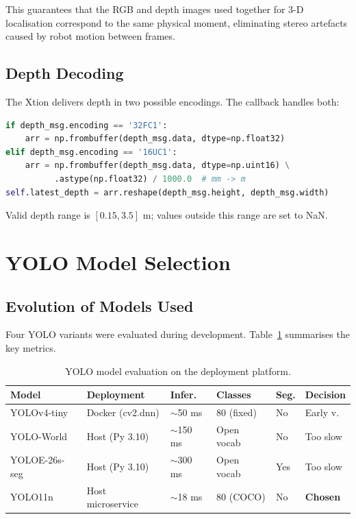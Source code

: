 This guarantees that the RGB and depth images used together for 3-D localisation
correspond to the same physical moment, eliminating stereo artefacts caused by
robot motion between frames.

\subsection{Depth Decoding}

The Xtion delivers depth in two possible encodings.
The callback handles both:

\begin{lstlisting}[language=Python, caption={Depth image decoding.}]
if depth_msg.encoding == '32FC1':
    arr = np.frombuffer(depth_msg.data, dtype=np.float32)
elif depth_msg.encoding == '16UC1':
    arr = np.frombuffer(depth_msg.data, dtype=np.uint16) \
          .astype(np.float32) / 1000.0  # mm -> m
self.latest_depth = arr.reshape(depth_msg.height, depth_msg.width)
\end{lstlisting}

Valid depth range is $[0.15, 3.5]$ m; values outside this range are set to NaN.

\section{YOLO Model Selection}

\subsection{Evolution of Models Used}

Four YOLO variants were evaluated during development.
Table~\ref{tab:yolo_eval} summarises the key metrics.

\begin{table}[H]
\centering
\caption{YOLO model evaluation on the deployment platform.}
\label{tab:yolo_eval}
\small
\begin{tabular}{llllll}
\toprule
\textbf{Model} & \textbf{Deployment} & \textbf{Infer.} & \textbf{Classes} & \textbf{Seg.} & \textbf{Decision} \\
\midrule
YOLOv4-tiny   & Docker (cv2.dnn)   & $\sim$50 ms  & 80 (fixed) & No  & Early v. \\
YOLO-World    & Host (Py 3.10)     & $\sim$150 ms & Open vocab & No  & Too slow \\
YOLOE-26s-seg & Host (Py 3.10)     & $\sim$300 ms & Open vocab & Yes & Too slow \\
YOLO11n       & Host microservice  & $\sim$18 ms  & 80 (COCO)  & No  & \textbf{Chosen} \\
\bottomrule
\end{tabular}
\normalsize
\end{table}

